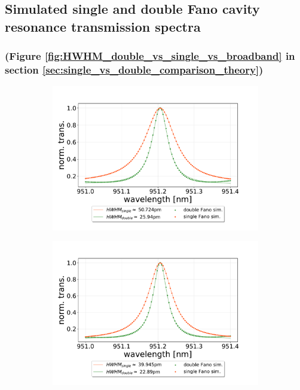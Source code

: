 \clearpage
\subsection{Simulated single and double Fano cavity resonance transmission spectra}

\subsubsection*{(Figure \ref{fig:HWHM_double_vs_single_vs_broadband} in section \ref{sec:single_vs_double_comparison_theory})}

\begin{figure}[h!]
    \centering
    \begin{subfigure}[b]{0.49\textwidth}
        \includegraphics[width=\textwidth]{figures/sim_single_vs_double_10um.pdf}
        \caption{}
        \label{fig:single_vs_double_simulation_10um}
    \end{subfigure}
    \begin{subfigure}[b]{0.49\textwidth}
        \includegraphics[width=\textwidth]{figures/sim_single_vs_double_30um.pdf}

\end{subfigure}
\end{figure}
